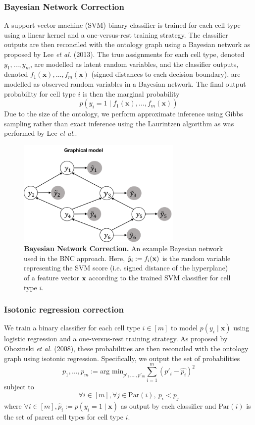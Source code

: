 \subsubsection*{Bayesian Network Correction}

A support vector machine (SVM) binary classifier is trained for each cell type using a linear kernel and a one-versus-rest training strategy. The classifier outputs are then reconciled with the ontology graph using a Bayesian network as proposed by Lee \textit{et al.} (2013).  The true assignments for each cell type, denoted $y_1, \dots, y_m$, are modelled as latent random variables, and the classifier outputs, denoted $f_1(\boldsymbol{x}), \dots, f_m(\boldsymbol{x})$ (signed distances to each decision boundary), are modelled as observed random variables in a Bayesian network.  The final output probability for cell type $i$ is then the marginal probability
$$p(y_i = 1 \mid f_1(\boldsymbol{x}), \dots, f_m(\boldsymbol{x}))$$
Due to the size of the ontology, we perform approximate inference using Gibbs sampling rather than exact inference using the Laurintzen algorithm as was performed by Lee \textit{et al.}.

\begin{figure}[htbp]
    \centerline{\includegraphics[width=8cm]{figures/BNC_graph.png}}
    \caption{\textbf{Bayesian Network Correction.} An example Bayesian network used in the BNC approach.  Here, $\tilde{y}_i := f_i(\bold{x})$ is the random variable representing the SVM score (i.e. signed distance of the hyperplane) of a feature vector $\bold{x}$ according to the trained SVM classifier for cell type $i$.}
    \label{fig:cell_type_setup}
      \end{figure}

\subsubsection*{Isotonic regression correction}

We train a binary classifier for each cell type $i \in [m]$ to model $p(y_i \mid \boldsymbol{x})$ using logistic regression and a one-versus-rest training strategy.  As proposed by Obozinski \textit{et al.} (2008), these probabilities are then reconciled with the ontology graph using isotonic regression. Specifically, we output the set of probabilities 
$$p_1, \dots, p_m := \text{arg min}_{p'_1, \dots, p'_m} \sum_{i=1}^m (p'_i - \hat{p_i})^2$$
subject to 
$$\forall i \in [m], \forall j \in \text{Par}(i), \ p_i < p_j$$
where $\forall i \in [m], \hat{p}_i := p(y_i=1 \mid \boldsymbol{x})$ as output by each classifier and $\text{Par}(i)$ is the set of parent cell types for cell type $i$. 

